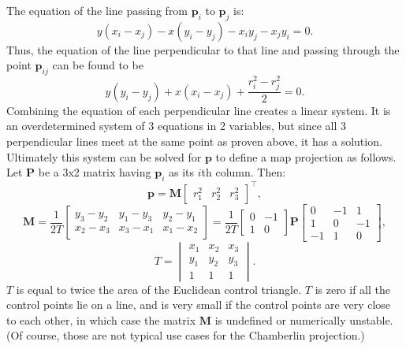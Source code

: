 \documentclass{amsart}[12pt]
\begin{document}
The equation of the line passing from $\mathbf p_i$ to $\mathbf p_j$ is:
\begin{equation}
y (x_i - x_j) - x (y_i - y_j) - x_i y_j - x_j y_i = 0.
\end{equation}
Thus, the equation of the line perpendicular to that line and passing through
the point $\mathbf p_{ij}$ can be found to be
\begin{equation}
y (y_i - y_j) + x (x_i - x_j) + \frac{r_i^2 - r_j^2}{2} = 0.
\end{equation}
Combining the equation of each perpendicular line creates a linear system.
It is an overdetermined system of 3 equations in 2 variables, but since all 3
perpendicular lines meet at the same point as proven above, it has a solution.
Ultimately this system can be solved for $\mathbf p$ to define a map projection
as follows. Let $\mathbf P$ be a 3x2 matrix having $\mathbf p_i$ as its $i$th
column. Then:
\begin{equation}\label{eq:forward}
\mathbf p = \mathbf M \begin{bmatrix} r^2_1 & r^2_2 & r^2_3 \end{bmatrix}^\top,
\end{equation}
\begin{equation}
\mathbf M = \frac{1}{2T}
\begin{bmatrix} y_3 - y_2 & y_1 - y_3 & y_2 - y_1 \\
x_2 - x_3 & x_3 - x_1 & x_1 - x_2 \end{bmatrix} = \frac{1}{2T}
\begin{bmatrix} 0 & -1  \\
1 & 0 \end{bmatrix}
\mathbf P
\begin{bmatrix} 0 & -1 & 1 \\
1 & 0 & -1 \\
-1 & 1 & 0 \end{bmatrix},
\end{equation}
\begin{equation}
T = \begin{vmatrix} x_1 & x_2 & x_3 \\
 y_1 & y_2 & y_3 \\
 1 & 1 & 1
\end{vmatrix}.
\end{equation}
$T$ is equal to twice the area of the Euclidean control triangle. $T$ is zero
if all the control points lie on a line, and is very small if the control
points are very close to each other, in which case the matrix $\mathbf M$ is
undefined or numerically unstable.
(Of course, those are not typical use cases for the Chamberlin projection.)
\end{document}
